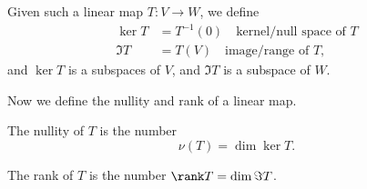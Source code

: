 \begin{prev}
    Given such a linear map \(T:V \to W\), we define 
    \begin{align*}
        \ker T &= T^{-1}(0) \quad \text{kernel/null space of }T \\
        \Im T  &= T(V) \quad \text{image/range of } T,
    \end{align*} 
    and \(\ker T\) is a subspaces of \(V\), and \(\Im T\) is a subspace of \(W\).   
\end{prev}

\begin{definition*}
    Now we define the nullity and rank of a linear map.
    \begin{definition}[nullity] \label{def:nullity}
        The nullity of \(T\) is the number 
        \[
            \nu (T) = \dim \ker T.
        \] 
    \end{definition}
    \begin{definition}[rank] \label{def:rank}
        The rank of \(T\) is the number \(\rank T = \dim \Im T\).  
    \end{definition}
\end{definition*}

